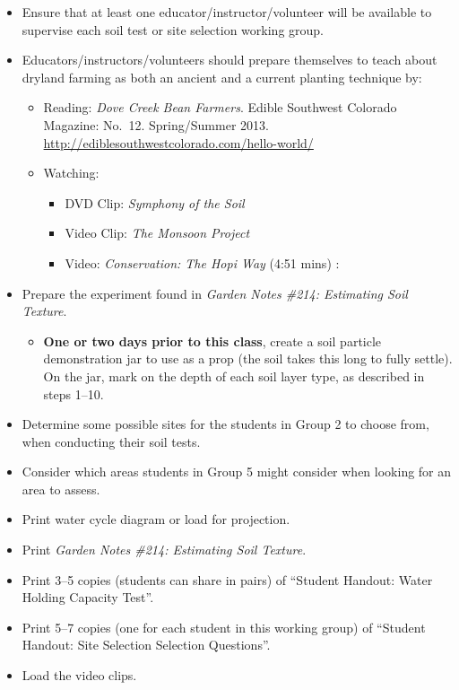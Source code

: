 \documentclass[12pt,]{article}
\providecommand{\tightlist}{%
  \setlength{\itemsep}{0pt}\setlength{\parskip}{0pt}}
\begin{document}
\begin{itemize}
\tightlist
\item
  Ensure that at least one educator/instructor/volunteer will be available to supervise each soil test or site selection working group.
\item
  Educators/instructors/volunteers should prepare themselves to teach about dryland farming as both an ancient and a current planting technique by:

  \begin{itemize}
  \tightlist
  \item
    Reading: \emph{Dove Creek Bean Farmers}. Edible Southwest Colorado Magazine: No.~12. Spring/Summer 2013. \url{http://ediblesouthwestcolorado.com/hello-world/}
  \item
    Watching:

    \begin{itemize}
    \tightlist
    \item
      DVD Clip: \emph{Symphony of the Soil}
    \item
      Video Clip: \emph{The Monsoon Project}
    \item
      Video: \emph{Conservation: The Hopi Way} (4:51 mins) :
    \end{itemize}
  \end{itemize}
\item
  Prepare the experiment found in \emph{Garden Notes \#214: Estimating Soil Texture}.

  \begin{itemize}
  \tightlist
  \item
    \textbf{One or two days prior to this class}, create a soil particle demonstration jar to use as a prop (the soil takes this long to fully settle). On the jar, mark on the depth of each soil layer type, as described in steps 1--10.
  \end{itemize}
\item
  Determine some possible sites for the students in Group 2 to choose from, when conducting their soil tests.
\item
  Consider which areas students in Group 5 might consider when looking for an area to assess.
\item
  Print water cycle diagram or load for projection.
\item
  Print \emph{Garden Notes \#214: Estimating Soil Texture}.
\item
  Print 3--5 copies (students can share in pairs) of ``Student Handout: Water Holding Capacity Test''.
\item
  Print 5--7 copies (one for each student in this working group) of ``Student Handout: Site Selection Selection Questions''.
\item
  Load the video clips.
\end{itemize}
\end{document}
